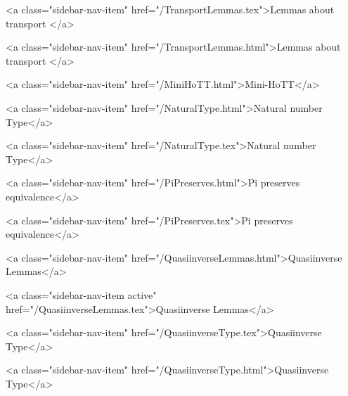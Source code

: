       
    
      
        
          <a class="sidebar-nav-item" href="/TransportLemmas.tex">Lemmas about transport </a>
        
      
    
      
        
          <a class="sidebar-nav-item" href="/TransportLemmas.html">Lemmas about transport </a>
        
      
    
      
        
          <a class="sidebar-nav-item" href="/MiniHoTT.html">Mini-HoTT</a>
        
      
    
      
        
          <a class="sidebar-nav-item" href="/NaturalType.html">Natural number Type</a>
        
      
    
      
        
          <a class="sidebar-nav-item" href="/NaturalType.tex">Natural number Type</a>
        
      
    
      
        
          <a class="sidebar-nav-item" href="/PiPreserves.html">Pi preserves equivalence</a>
        
      
    
      
        
          <a class="sidebar-nav-item" href="/PiPreserves.tex">Pi preserves equivalence</a>
        
      
    
      
        
          <a class="sidebar-nav-item" href="/QuasiinverseLemmas.html">Quasiinverse Lemmas</a>
        
      
    
      
        
          <a class="sidebar-nav-item active" href="/QuasiinverseLemmas.tex">Quasiinverse Lemmas</a>
        
      
    
      
        
          <a class="sidebar-nav-item" href="/QuasiinverseType.tex">Quasiinverse Type</a>
        
      
    
      
        
          <a class="sidebar-nav-item" href="/QuasiinverseType.html">Quasiinverse Type</a>
        

